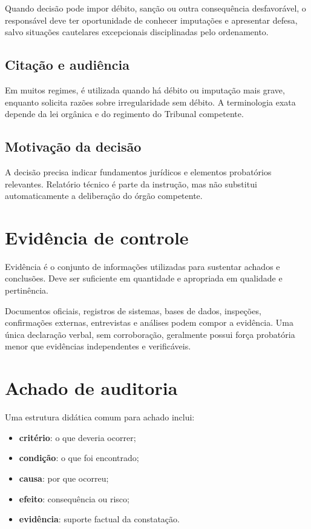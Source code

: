 Quando decisão pode impor débito, sanção ou outra consequência desfavorável, o responsável deve ter oportunidade de conhecer imputações e apresentar defesa, salvo situações cautelares excepcionais disciplinadas pelo ordenamento.

\subsection{Citação e audiência}

Em muitos regimes,  é utilizada quando há débito ou imputação mais grave, enquanto  solicita razões sobre irregularidade sem débito. A terminologia exata depende da lei orgânica e do regimento do Tribunal competente.

\subsection{Motivação da decisão}

A decisão precisa indicar fundamentos jurídicos e elementos probatórios relevantes. Relatório técnico é parte da instrução, mas não substitui automaticamente a deliberação do órgão competente.

\section{Evidência de controle}

Evidência é o conjunto de informações utilizadas para sustentar achados e conclusões. Deve ser suficiente em quantidade e apropriada em qualidade e pertinência.

Documentos oficiais, registros de sistemas, bases de dados, inspeções, confirmações externas, entrevistas e análises podem compor a evidência. Uma única declaração verbal, sem corroboração, geralmente possui força probatória menor que evidências independentes e verificáveis.

\section{Achado de auditoria}

Uma estrutura didática comum para achado inclui:
\begin{itemize}
\item \textbf{critério}: o que deveria ocorrer;
\item \textbf{condição}: o que foi encontrado;
\item \textbf{causa}: por que ocorreu;
\item \textbf{efeito}: consequência ou risco;
\item \textbf{evidência}: suporte factual da constatação.
\end{itemize}

